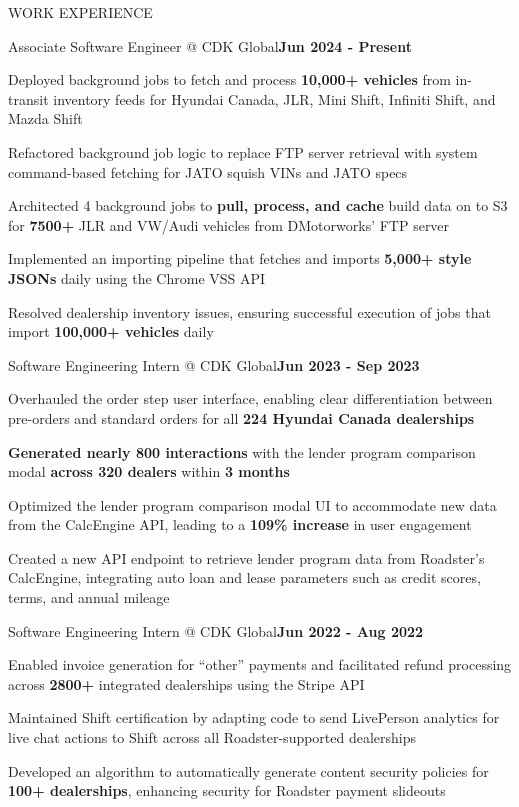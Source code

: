 \documentclass[]{resume}
\begin{document}
\begin{section}{WORK EXPERIENCE}
    \begin{subsection}{Associate Software Engineer @ CDK Global}{}{\textbf{Jun 2024 - Present}}{}
        \item Deployed background jobs to fetch and process \textbf{10,000+ vehicles} from in-transit inventory feeds for Hyundai Canada, JLR, Mini Shift, Infiniti Shift, and Mazda Shift
        \item Refactored background job logic to replace FTP server retrieval with system command-based fetching for JATO squish VINs and JATO specs
        \item Architected 4 background jobs to \textbf{pull, process, and cache} build data on to S3 for \textbf{7500+} JLR and VW/Audi vehicles from DMotorworks' FTP server
        \item Implemented an importing pipeline that fetches and imports \textbf{5,000+ style JSONs} daily using the Chrome VSS API
        \item Resolved dealership inventory issues, ensuring successful execution of jobs that import \textbf{100,000+ vehicles} daily
    \end{subsection}
    \begin{subsection}{Software Engineering Intern @ CDK Global}{}{\textbf{Jun 2023 - Sep 2023}}{}
        \item Overhauled the order step user interface, enabling clear differentiation between pre-orders and standard orders for all \textbf{224 Hyundai Canada dealerships}
        \item \textbf{Generated nearly 800 interactions} with the lender program comparison modal \textbf{across 320 dealers} within \textbf{3 months}
        \item Optimized the lender program comparison modal UI to accommodate new data from the CalcEngine API, leading to a \textbf{109\% increase} in user engagement
        \item Created a new API endpoint to retrieve lender program data from Roadster's CalcEngine, integrating auto loan and lease parameters such as credit scores, terms, and annual mileage
    \end{subsection}
    \begin{subsection}{Software Engineering Intern @ CDK Global}{}{\textbf{Jun 2022 - Aug 2022}}{}
        \item Enabled invoice generation for “other” payments and facilitated refund processing across \textbf{2800+} integrated dealerships using the Stripe API
        \item Maintained Shift certification by adapting code to send LivePerson analytics for live chat actions to Shift across all Roadster-supported dealerships
        \item Developed an algorithm to automatically generate content security policies for \textbf{100+ dealerships}, enhancing security for Roadster payment slideouts
    \end{subsection}
\end{section}
\end{document}

